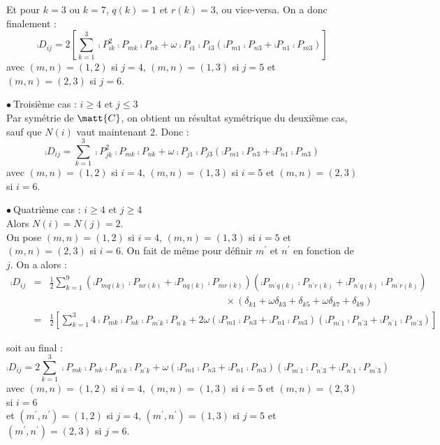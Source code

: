 Et pour $k=3$ ou $k=7$, $q(k)=1$ et $r(k)=3$, ou vice-versa. On a donc
finalement :
\begin{equation}
\comp{D}_{ij}=2\left[\sum_{k=1}^3
\comp{P}_{ik}^2\comp{P}_{mk}\comp{P}_{nk}
+\omega\comp{P}_{i1}\comp{P}_{i3}\left(
\comp{P}_{m1}\comp{P}_{n3}+\comp{P}_{n1}\comp{P}_{m3}\right)
\right]
\end{equation}
avec $(m,n)=(1,2)$ si $j=4$, $(m,n)=(1,3)$ si $j=5$ et $(m,n)=(2,3)$ si
$j=6$.

\vspace{1cm}
$\bullet\ ${\sc Troisi\`eme cas} : $i\geqslant 4$ et $j\leqslant 3$\\
Par sym\'etrie de $\matt{C}$, on obtient un r\'esultat sym\'etrique du
deuxi\`eme cas, sauf que $N(i)$ vaut maintenant 2. Donc :
\begin{equation}
\comp{D}_{ij}=\sum_{k=1}^3
\comp{P}_{jk}^2\comp{P}_{mk}\comp{P}_{nk}
+\omega\comp{P}_{j1}\comp{P}_{j3}\left(
\comp{P}_{m1}\comp{P}_{n3}+\comp{P}_{n1}\comp{P}_{m3}\right)
\end{equation}
avec $(m,n)=(1,2)$ si $i=4$, $(m,n)=(1,3)$ si $i=5$ et $(m,n)=(2,3)$ si
$i=6$.

\vspace{1cm}
$\bullet\ ${\sc Quatri\`eme cas} : $i\geqslant 4$ et $j\geqslant 4$\\
Alors $N(i)=N(j)=2$.\\
On pose $(m,n)=(1,2)$ si $i=4$, $(m,n)=(1,3)$ si $i=5$ et
$(m,n)=(2,3)$ si $i=6$. On fait de m\^eme pour d\'efinir $m^\prime$ et
$n^\prime$ en fonction de $j$. On a alors :
\begin{eqnarray}
\comp{D}_{ij}&=&\frac{1}{2}\sum_{k=1}^9
\left(\comp{P}_{mq(k)}\comp{P}_{nr(k)}+\comp{P}_{nq(k)}\comp{P}_{mr(k)}\right)
\left(\comp{P}_{m^\prime q(k)}\comp{P}_{n^\prime r(k)}
+\comp{P}_{n^\prime q(k)}\comp{P}_{m^\prime r(k)}\right)\nonumber\\
&&\qquad\qquad\qquad\qquad\qquad\qquad\qquad\qquad\qquad\times
(\delta_{k1}+\omega\delta_{k3}+\delta_{k5}+\omega\delta_{k7}+\delta_{k9})\nonumber\\
&=&\frac{1}{2}\left[
\sum_{k=1}^3 4\comp{P}_{mk}\comp{P}_{nk}
\comp{P}_{m^\prime k}\comp{P}_{n^\prime k}
+2\omega\left(\comp{P}_{m1}\comp{P}_{n3}+\comp{P}_{n1}\comp{P}_{m3}\right)
\left(\comp{P}_{m^\prime 1}\comp{P}_{n^\prime 3}
+\comp{P}_{n^\prime 1}\comp{P}_{m^\prime 3}\right)\right]
\end{eqnarray}

soit au final :
\begin{equation}
\comp{D}_{ij}=
2\sum_{k=1}^3 \comp{P}_{mk}\comp{P}_{nk}
\comp{P}_{m^\prime k}\comp{P}_{n^\prime k}
+\omega\left(\comp{P}_{m1}\comp{P}_{n3}+\comp{P}_{n1}\comp{P}_{m3}\right)
\left(\comp{P}_{m^\prime 1}\comp{P}_{n^\prime 3}
+\comp{P}_{n^\prime 1}\comp{P}_{m^\prime 3}\right)
\end{equation}
avec $(m,n)=(1,2)$ si $i=4$, $(m,n)=(1,3)$ si $i=5$ et $(m,n)=(2,3)$ si
$i=6$\\
et $(m^\prime ,n^\prime )=(1,2)$ si $j=4$, $(m^\prime ,n^\prime )=(1,3)$
si $j=5$ et $(m^\prime ,n^\prime )=(2,3)$ si $j=6$.


